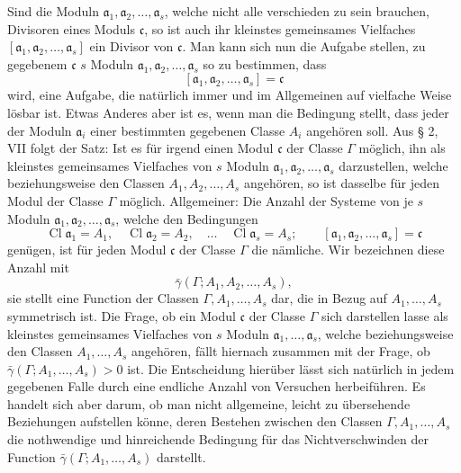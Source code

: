 \documentclass[11pt,a4paper]{article}
\newcommand{\Cl}{\operatorname{Cl}}
\begin{document}
Sind die Moduln $\mathfrak a_1,\mathfrak a_2,\ldots,\mathfrak a_s$, welche nicht alle verschieden zu sein brauchen, Divisoren eines Moduls $\mathfrak c$, so ist auch ihr kleinstes gemeinsames Vielfaches $[\mathfrak a_1,\mathfrak a_2,\ldots,\mathfrak a_s]$ ein Divisor von $\mathfrak c$. Man kann sich nun die Aufgabe stellen, zu gegebenem $\mathfrak c$ $s$ Moduln $\mathfrak a_1,\mathfrak a_2,\ldots,\mathfrak a_s$ so zu bestimmen, dass
\[
 [\mathfrak a_1,\mathfrak a_2,\ldots,\mathfrak a_s]=\mathfrak c
\]
wird, eine Aufgabe, die natürlich immer und im Allgemeinen auf vielfache Weise lösbar ist. Etwas Anderes aber ist es, wenn man die Bedingung stellt, dass jeder der Moduln $\mathfrak a_i$ einer bestimmten gegebenen Classe $A_i$ angehören soll. Aus § 2, VII folgt der Satz: Ist es für irgend einen Modul $\mathfrak c$ der Classe $\Gamma$ möglich, ihn als kleinstes gemeinsames Vielfaches von $s$ Moduln $\mathfrak a_1,\mathfrak a_2,\ldots,\mathfrak a_s$ darzustellen, welche beziehungsweise den Classen $A_1,A_2,\ldots,A_s$ angehören, so ist dasselbe für jeden Modul der Classe $\Gamma$ möglich. Allgemeiner: Die Anzahl der Systeme von je $s$ Moduln $\mathfrak a_1,\mathfrak a_2,\ldots,\mathfrak a_s$, welche den Bedingungen
\[
 \Cl\mathfrak a_1=A_1,
 \quad
 \Cl\mathfrak a_2=A_2,
 \quad\ldots\quad
 \Cl\mathfrak a_s=A_s;
 \qquad
 [\mathfrak a_1,\mathfrak a_2,\ldots,\mathfrak a_s]=\mathfrak c
\]
genügen, ist für jeden Modul $\mathfrak c$ der Classe $\Gamma$ die nämliche. Wir bezeichnen diese Anzahl mit
\[
 \bar\gamma(\Gamma;A_1,A_2,\ldots,A_s),
\]
sie stellt eine Function der Classen $\Gamma,A_1,\ldots,A_s$ dar, die in Bezug auf $A_1,\ldots,A_s$ symmetrisch ist. Die Frage, ob ein Modul $\mathfrak c$ der Classe $\Gamma$ sich darstellen lasse als kleinstes gemeinsames Vielfaches von $s$ Moduln $\mathfrak a_1,\ldots,\mathfrak a_s$, welche beziehungsweise den Classen $A_1,\ldots,A_s$ angehören, fällt hiernach zusammen mit der Frage, ob $\bar\gamma(\Gamma;A_1,\ldots,A_s)>0$ ist. Die Entscheidung hierüber lässt sich natürlich in jedem gegebenen Falle durch eine endliche Anzahl von Versuchen herbeiführen. Es handelt sich aber darum, ob man nicht allgemeine, leicht zu übersehende Beziehungen aufstellen könne, deren Bestehen zwischen den Classen $\Gamma,A_1,\ldots,A_s$ die nothwendige und hinreichende Bedingung für das Nichtverschwinden der Function $\bar\gamma(\Gamma;A_1,\ldots,A_s)$ darstellt.
\end{document}
